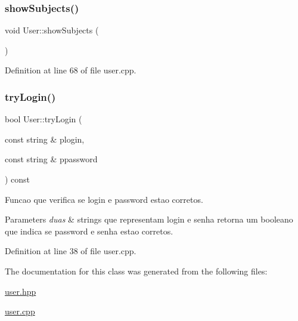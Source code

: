 \subsubsection{\texorpdfstring{show\+Subjects()}{showSubjects()}}
{\footnotesize\ttfamily void User\+::show\+Subjects (\begin{DoxyParamCaption}{ }\end{DoxyParamCaption})}



Definition at line 68 of file user.\+cpp.

\mbox{\label{class_user_af85eb63b7c9f95d82c1ccfc5b1f07761}} 
\subsubsection{\texorpdfstring{try\+Login()}{tryLogin()}}
{\footnotesize\ttfamily bool User\+::try\+Login (\begin{DoxyParamCaption}\item[{const string \&}]{plogin,  }\item[{const string \&}]{ppassword }\end{DoxyParamCaption}) const}



Funcao que verifica se login e password estao corretos. 


\begin{DoxyParams}{Parameters}
{\em duas} & strings que representam login e senha  retorna um booleano que indica se password e senha estao corretos. \\
\hline
\end{DoxyParams}


Definition at line 38 of file user.\+cpp.



The documentation for this class was generated from the following files\+:\begin{DoxyCompactItemize}
\item 
\hyperlink{user_8hpp}{user.\+hpp}\item 
\hyperlink{user_8cpp}{user.\+cpp}\end{DoxyCompactItemize}
